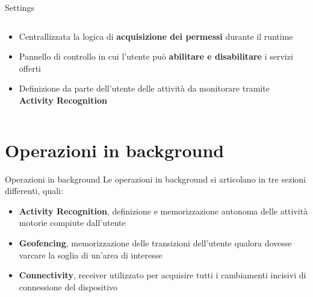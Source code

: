 \documentclass[10pt]{beamer}
\begin{document}
\begin{frame}{Settings}
    \begin{columns}
        \begin{column}{0.5\textwidth}
            \hspace*{100pt}
                \begin{itemize}
                    \item \small Centrallizzata la logica di \textbf{acquisizione dei permessi} durante il runtime
                    \item \small Pannello di controllo in cui l'utente può \textbf{abilitare e disabilitare} i servizi offerti
                    \item \small Definizione da parte dell'utente delle attività da monitorare tramite \textbf{Activity Recognition} 
                \end{itemize}
        \end{column}
        \begin{column}{0.5\textwidth}
            \begin{center}
            \end{center}
        \end{column}
    \end{columns}
\end{frame}

\section{Operazioni in background}
\begin{frame}{Operazioni in background}
    \small Le operazioni in background si articolano in tre sezioni differenti, quali:
    \begin{itemize}
        \item \small \textbf{Activity Recognition}, definizione e memorizzazione autonoma delle attività motorie compiute dall'utente
        \item \small \textbf{Geofencing}, memorizzazione delle transizioni dell'utente qualora dovesse varcare la soglia di un'area di interesse
        \item \small \textbf{Connectivity}, receiver utilizzato per acquisire tutti i cambiamenti incisivi di connessione del dispositivo
    \end{itemize}
\end{frame}
\end{document}
